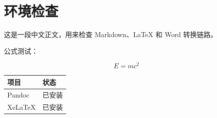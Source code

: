 \documentclass[
]{article}
\author{}
\date{}
\newcounter{none} %
\begin{document}
\section{环境检查}\label{ux73afux5883ux68c0ux67e5}

这是一段中文正文，用来检查 Markdown、LaTeX 和 Word 转换链路。

公式测试：

\[
E = mc^2
\]

{\def\LTcaptype{none} %
\begin{longtable}[]{@{}ll@{}}
\toprule\noalign{}
项目 & 状态 \\
\midrule\noalign{}
\endhead
\bottomrule\noalign{}
\endlastfoot
Pandoc & 已安装 \\
XeLaTeX & 已安装 \\
\end{longtable}
}
\end{document}
